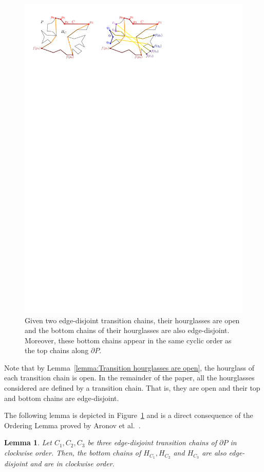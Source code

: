 \documentclass[a4paper]{article}
\newtheorem{lemma}[theorem]{Lemma}
\begin{document}
\begin{figure}[tb]
\centering
\includegraphics{img/TransitionChains.pdf}
\caption{\small Given two edge-disjoint transition chains, their hourglasses are open and
the bottom chains of their hourglasses are also edge-disjoint. 
Moreover, these bottom chains appear in the same cyclic order as the top chains along $\partial P$.}
\label{fig:Transition chains and hourglasses}
\end{figure}

Note that by Lemma~\ref{lemma:Transition hourglasses are open}, the hourglass of each transition chain is open.
In the remainder of the paper, all the hourglasses considered are defined by a transition chain. That is, they are open and their top and bottom chains are edge-disjoint.

The following lemma is depicted in Figure~\ref{fig:Transition chains and hourglasses} and is a direct consequence of the Ordering Lemma proved by Aronov et al.~\cite[Corollary 2.7.4]{aronov1993furthest}.
\begin{lemma}\label{lemma:Ordering Lemma}
Let $C_1, C_2, C_3$ be three edge-disjoint transition chains of $\partial P$ in clockwise order. Then, the bottom chains of $H_{C_1}, H_{C_2}$ and $H_{C_3}$ are also edge-disjoint and are in clockwise order.
\end{lemma}
\end{document}
